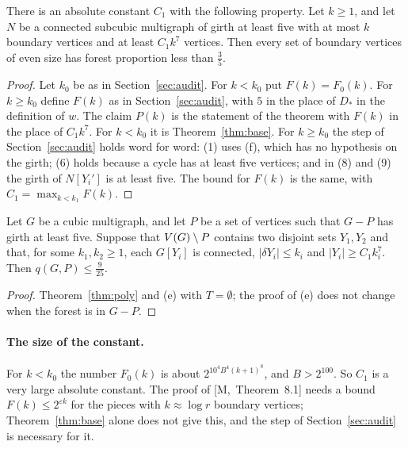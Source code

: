 \documentclass[11pt]{article}
\newcommand{\M}[1]{[M,~#1]}
\begin{document}
\begin{theorem}\label{thm:poly}
There is an absolute constant $C_1$ with the following property. Let $k\ge1$, and let $N$ be a
connected subcubic multigraph of girth at least five with at most $k$ boundary vertices and at
least $C_1k^{7}$ vertices. Then every set of boundary vertices of even size has forest
proportion less than $\frac35$.
\end{theorem}

\begin{proof}
Let $k_0$ be as in Section~\ref{sec:audit}. For $k<k_0$ put $F(k)=F_0(k)$. For $k\ge k_0$ define
$F(k)$ as in Section~\ref{sec:audit}, with $5$ in the place of $D_*$ in the definition of $w$.
The claim $P(k)$ is the statement of the theorem with $F(k)$ in the place of $C_1k^{7}$. For
$k<k_0$ it is Theorem~\ref{thm:base}. For $k\ge k_0$ the step of Section~\ref{sec:audit} holds
word for word: (1) uses (f), which has no hypothesis on the girth; (6) holds because a cycle has
at least five vertices; and in (8) and (9) the girth of $N[Y_i']$ is at least five. The bound
for $F(k)$ is the same, with $C_1=\max_{k<k_1}F(k)$.
\end{proof}

\begin{corollary}\label{cor:two}
Let $G$ be a cubic multigraph, and let $P$ be a set of vertices such that $G-P$ has girth at least
five. Suppose that $V(G)\setminus P$ contains two disjoint sets $Y_1,Y_2$ and that, for some
$k_1,k_2\ge1$, each $G[Y_i]$ is connected, $|\delta Y_i|\le k_i$ and $|Y_i|\ge C_1k_i^{7}$. Then
$q(G,P)\le\frac9{25}$.
\end{corollary}

\begin{proof}
Theorem~\ref{thm:poly} and (e) with $T=\emptyset$; the proof of (e) does not change when the
forest is in $G-P$.
\end{proof}

\paragraph{The size of the constant.} For $k<k_0$ the number $F_0(k)$ is about
$2^{10^{4}B^{4}(k+1)^{8}}$, and $B>2^{100}$. So $C_1$ is a very large absolute constant. The
proof of \M{Theorem~8.1} needs a bound $F(k)\le2^{\varepsilon k}$ for the pieces with
$k\approx\log r$ boundary vertices; Theorem~\ref{thm:base} alone does not give this, and the
step of Section~\ref{sec:audit} is necessary for it.
\end{document}
